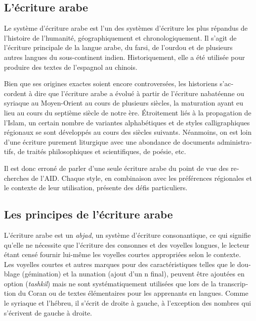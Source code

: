 \begin{french}
\section{L'écriture arabe}

Le système d'écriture arabe est l'un des systèmes d'écriture les plus répandus
de l'histoire de l'humanité, géographiquement et chronologiquement. Il s'agit
de l'écriture principale de la langue arabe, du farsi, de l'ourdou et de
plusieurs autres langues du sous-continent indien. Historiquement, elle a été
utilisée pour produire des textes de l'espagnol au chinois.

Bien que ses origines exactes soient encore controversées, les historiens
s'accordent à dire que l'écriture arabe a évolué à partir de l'écriture
nabatéenne ou syriaque au Moyen-Orient au cours de plusieurs siècles, la
maturation ayant eu lieu au cours du septième siècle de notre ère.  Étroitement
liés à la propagation de l'Islam, un certain nombre de variantes alphabétiques
et de styles calligraphiques régionaux se sont développés au cours des siècles
suivants. Néanmoins, on est loin d'une écriture purement liturgique avec une
abondance de documents administratifs, de traités philosophiques et
scientifiques, de poésie, etc.

Il est donc erroné de parler d'une seule écriture arabe du point de vue des
recherches de l'AID. Chaque style, en combinaison avec les préférences
régionales et le contexte de leur utilisation, présente des défis particuliers.

\subsection{Les principes de l'écriture arabe}

L'écriture arabe est un \emph{abjad}, un système d'écriture consonantique, ce qui
signifie qu'elle ne nécessite que l'écriture des consonnes et des voyelles
longues, le lecteur étant censé fournir lui-même les voyelles courtes
appropriées selon le contexte.  Les voyelles courtes et autres marques pour des
caractéristiques telles que le doublage (gémination) et la nunation (ajout d'un
n final), peuvent être ajoutées en option (\emph{tashkil}) mais ne sont
systématiquement utilisées que lors de la transcription du Coran ou de textes
élémentaires pour les apprenants en langues. Comme le syriaque et l'hébreu, il
s'écrit de droite à gauche, à l'exception des nombres qui s'écrivent de gauche
à droite.


\end{french}
